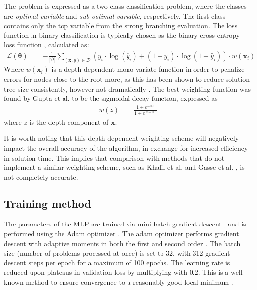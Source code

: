 The problem is expressed as a two-class classification problem, where the classes are \textit{optimal variable} and \textit{sub-optimal variable}, respectively. The first class contains only the top variable from the strong branching evaluation. The loss function in binary classification is typically chosen as the binary cross-entropy loss function \cite{goodfellow2016deep}, calculated as:
\begin{align}
    \bm{\mathcal{L}}(\bm{\theta}) &= - \frac{1}{|\mathcal{D}|}\sum_{(\bm{x}, y) \in \mathcal{D}} \left( y_i \cdot \log( \hat y_i) + (1-y_i) \cdot \log(1 - \hat y_i) \right)\cdot w(\bm{x}_i)
\end{align}
Where $w(\bm{x}_i)$ is a depth-dependent mono-variate function in order to penalize errors for nodes close to the root more, as this has been shown to reduce solution tree size consistently, however not dramatically \cite{gupta2020hybrid}. The best weighting function was found by Gupta et al. \cite{gupta2020hybrid} to be the sigmoidal decay function, expressed as
%
\begin{align}
    w(z) &= \frac{1+e^{-0.5}}{1+e^{\; z-0.5}}
\end{align}
%
where $z$ is the depth-component of $ \bm{x} $.

It is worth noting that this depth-dependent weighting scheme will negatively impact the overall accuracy of the algorithm, in exchange for increased efficiency in solution time. This implies that comparison with methods that do not implement a similar weighting scheme, such as Khalil et al. \cite{khalil2016learning} and Gasse et al. \cite{gasse2019exact}, is not completely accurate.   


\subsection{Training method}

The parameters of the \gls{MLP} are trained via mini-batch gradient descent \cite{goodfellow2016deep}, and is performed using 
 the Adam optimizer \cite{kingma2017adam}. The adam optimizer performs gradient descent with adaptive moments in both the first and second order \cite{kingma2017adam}. 
 The batch size (number of problems processed at once) is set to 32, with 312 gradient descent steps per epoch for a maximum of 100 epochs. The learning rate is reduced upon plateaus in validation loss 
 by multiplying with $ 0.2 $. This is a well-known method to ensure convergence to a reasonably good local minimum \cite{goodfellow2016deep}.


